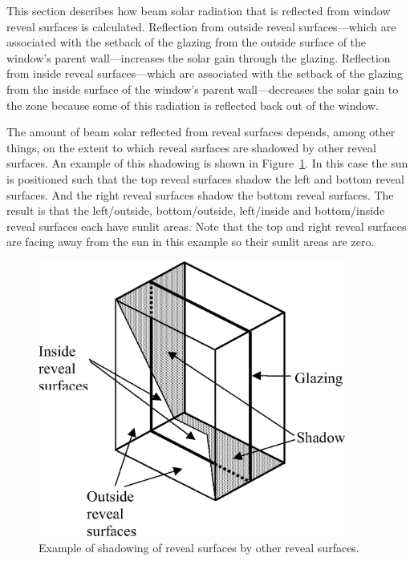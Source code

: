 This section describes how beam solar radiation that is reflected from window reveal surfaces is calculated. Reflection from outside reveal surfaces---which are associated with the setback of the glazing from the outside surface of the window's parent wall---increases the solar gain through the glazing. Reflection from inside reveal surfaces---which are associated with the setback of the glazing from the inside surface of the window's parent wall---decreases the solar gain to the zone because some of this radiation is reflected back out of the window.

The amount of beam solar reflected from reveal surfaces depends, among other things, on the extent to which reveal surfaces are shadowed by other reveal surfaces. An example of this shadowing is shown in Figure~\ref{fig:example-of-shadowing-of-reveal-surfaces-by}. In this case the sun is positioned such that the top reveal surfaces shadow the left and bottom reveal surfaces. And the right reveal surfaces shadow the bottom reveal surfaces. The result is that the left/outside, bottom/outside, left/inside and bottom/inside reveal surfaces each have sunlit areas. Note that the top and right reveal surfaces are facing away from the sun in this example so their sunlit areas are zero.

\begin{figure}[hbtp] %
\centering
\includegraphics[width=0.9\textwidth, height=0.9\textheight, keepaspectratio=true]{media/image1593.png}
\caption{Example of shadowing of reveal surfaces by other reveal surfaces. \protect \label{fig:example-of-shadowing-of-reveal-surfaces-by}}
\end{figure}

